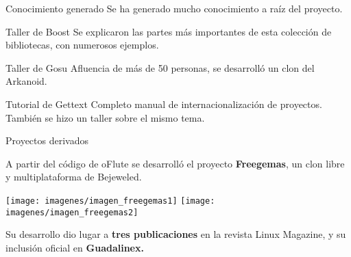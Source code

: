 \begin{frame}{Conocimiento generado}
  Se ha generado mucho conocimiento a raíz del proyecto. 

  \pause

  \begin{block}{Taller de Boost}
    Se explicaron las partes más importantes de esta colección de bibliotecas,
    con numerosos ejemplos.
  \end{block}

  \pause

  \begin{block}{Taller de Gosu}
    Afluencia de más de 50 personas, se desarrolló un clon del Arkanoid.
  \end{block}

  \pause

  \begin{block}{Tutorial de Gettext}
    Completo manual de internacionalización de proyectos. También se hizo un
    taller sobre el mismo tema.
  \end{block}
\end{frame}

\begin{frame}{Proyectos derivados}

  \begin{center}
    A partir del código de oFlute se desarrolló el proyecto \textbf{Freegemas}, un clon
    libre y multiplataforma de Bejeweled.

    \medskip

    \texttt{[image: imagenes/imagen\_freegemas1]}\hspace{0.1cm}
    \texttt{[image: imagenes/imagen\_freegemas2]}

    \medskip

    Su desarrollo dio lugar a \textbf{tres publicaciones} en la revista Linux
    Magazine, y su inclusión oficial en \textbf{Guadalinex.}
  \end{center}

\end{frame}

